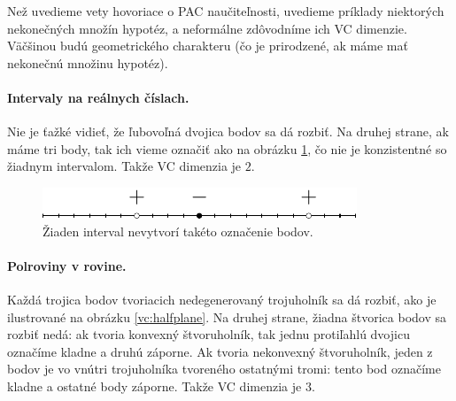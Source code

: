 Než uvedieme vety hovoriace o PAC naučiteľnosti, uvedieme príklady
niektorých nekonečných množín hypotéz, a neformálne zdôvodníme ich
VC dimenzie. Väčšinou budú geometrického charakteru (čo je prirodzené,
ak máme mať nekonečnú množinu hypotéz).

\paragraph{Intervaly na reálnych číslach.} Nie je ťažké vidieť, že
ľubovoľná dvojica bodov sa dá rozbiť. Na druhej strane, ak máme tri
body, tak ich vieme označiť ako na obrázku \ref{vc:interval}, čo nie
je konzistentné so žiadnym intervalom. Takže VC dimenzia je $2$.

\begin{figure}
  \centering
  \includegraphics[scale=1]{obrazky/interval.pdf}
  \caption{Žiaden interval nevytvorí takéto označenie bodov.}
  \label{vc:interval}
\end{figure}

\paragraph{Polroviny v rovine.} Každá trojica bodov tvoriacich
nedegenerovaný trojuholník sa dá rozbiť, ako je ilustrované na
obrázku \ref{vc:halfplane}. Na druhej strane, žiadna štvorica bodov
sa rozbiť nedá: ak tvoria konvexný štvoruholník, tak jednu protiľahlú 
dvojicu označíme kladne a druhú záporne. Ak tvoria nekonvexný 
štvoruholník, jeden z bodov je vo vnútri trojuholníka tvoreného 
ostatnými tromi: tento bod označíme kladne a ostatné body záporne.
Takže VC dimenzia je $3$.

